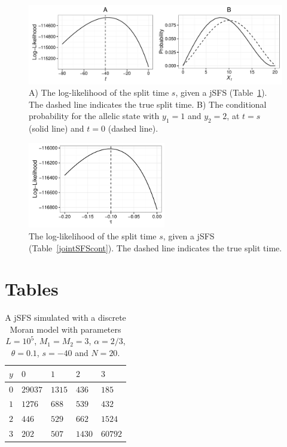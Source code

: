 \documentclass[preprint]{elsarticle}
\newcommand\y{\ensuremath{y}}
\begin{document}
\begin{figure}[ht]
\includegraphics[width = 12cm]{twoPop_29_8_2016.pdf}
\caption{A) The log-likelihood of the split time $s$, given a jSFS (Table~\ref{jointSFSdiscr}). The dashed line indicates the true split time. B) The conditional probability for the allelic state with $y_1=1$ and $y_2=2$, at $t=s$ (solid line) and $t=0$ (dashed line).}\label{twoPopdiscr}
\end{figure}

\begin{figure}[ht]
\includegraphics[width = 6cm]{forw_back_ll_cont.pdf}
\caption{The log-likelihood of the split time $s$, given a jSFS (Table~\ref{jointSFScont}). The dashed line indicates the true split time.}\label{twoPopcont}
\end{figure}

\clearpage

\section*{Tables}

\begin{table}[ht]
\centering
\caption{A jSFS simulated with a discrete Moran model with parameters $L=10^5$, $M_1=M_2=3$, $\alpha=2/3$, $\theta=0.1$, $s=-40$ and $N=20$.}
  \begin{tabular}{lllll}
  \toprule
    $\y$&$0$&$1$&$2$&$3$\\
    \midrule
    $0$  &$29037$ &$1315$ &$436$  &$185$\\ 
    $1$  &$1276$  &$688$  &$539$  &$432$\\  
    $2$  &$446$   &$529$  &$662$  &$1524$\\  
    $3$  &$202$   &$507$  &$1430$ &$60792$\\
    \bottomrule
  \end{tabular}\label{jointSFSdiscr}
\end{table}
\end{document}
